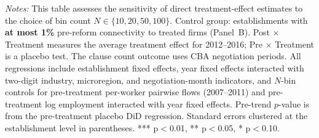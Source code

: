 \begin{table}[H]
\begin{threeparttable}
\begin{tablenotes}
\item \textit{Notes:} This table assesses the sensitivity of direct treatment-effect estimates to the choice of bin count $N \in \{10, 20, 50, 100\}$. Control group: establishments with \textbf{at most 1\%} pre-reform connectivity to treated firms (Panel~B). Post $\times$ Treatment measures the average treatment effect for 2012--2016; Pre $\times$ Treatment is a placebo test. The clause count outcome uses CBA negotiation periods. All regressions include establishment fixed effects, year fixed effects interacted with two-digit industry, microregion, and negotiation-month indicators, and $N$-bin controls for pre-treatment per-worker pairwise flows (2007--2011) and pre-treatment log employment interacted with year fixed effects. Pre-trend $p$-value is from the pre-treatment placebo DiD regression. Standard errors clustered at the establishment level in parentheses. *** p$<$0.01, ** p$<$0.05, * p$<$0.10.
\end{tablenotes}
\end{threeparttable}
\end{table}